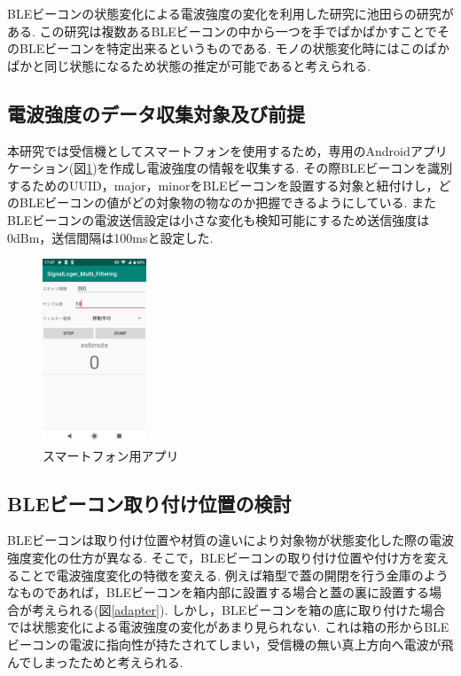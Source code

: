 \documentclass[Japanese]{dicomopapers}
\begin{document}
BLEビーコンの状態変化による電波強度の変化を利用した研究に池田ら\cite{BLEpkpk}の研究がある.
この研究は複数あるBLEビーコンの中から一つを手でぱかぱかすことでそのBLEビーコンを特定出来るというものである.
モノの状態変化時にはこのぱかぱかと同じ状態になるため状態の推定が可能であると考えられる.





\subsection{電波強度のデータ収集対象及び前提}

本研究では受信機としてスマートフォンを使用するため，専用のAndroidアプリケーション(図\ref{phoneApp})を作成し電波強度の情報を収集する.
その際BLEビーコンを識別するためのUUID，major，minorをBLEビーコンを設置する対象と紐付けし，どのBLEビーコンの値がどの対象物の物なのか把握できるようにしている.
またBLEビーコンの電波送信設定は小さな変化も検知可能にするため送信強度は0dBm，送信間隔は100msと設定した.

\begin{figure}[ht]
    \centering
    \includegraphics[height=5.5cm]{application.jpg}
    \caption{スマートフォン用アプリ}
    \label{phoneApp}
\end{figure}






\subsection{BLEビーコン取り付け位置の検討}
BLEビーコンは取り付け位置や材質の違いにより対象物が状態変化した際の電波強度変化の仕方が異なる.
そこで，BLEビーコンの取り付け位置や付け方を変えることで電波強度変化の特徴を変える.
例えば箱型で蓋の開閉を行う金庫のようなものであれば，BLEビーコンを箱内部に設置する場合と蓋の裏に設置する場合が考えられる(図\ref{adapter}).
しかし，BLEビーコンを箱の底に取り付けた場合では状態変化による電波強度の変化があまり見られない.
これは箱の形からBLEビーコンの電波に指向性が持たされてしまい，受信機の無い真上方向へ電波が飛んでしまったためと考えられる.
\end{document}
